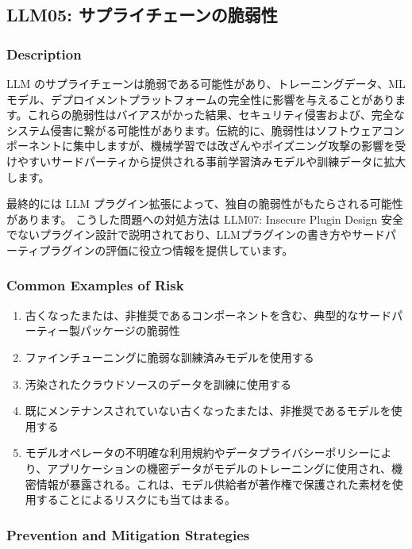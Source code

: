 \documentclass[
]{article}
\author{}
\date{}
\providecommand{\tightlist}{%
  \setlength{\itemsep}{0pt}\setlength{\parskip}{0pt}}
\begin{document}
\subsection{LLM05:
サプライチェーンの脆弱性}\label{llm05-ux30b5ux30d7ux30e9ux30a4ux30c1ux30a7ux30fcux30f3ux306eux8106ux5f31ux6027}

\subsubsection{Description}\label{description}

LLM
のサプライチェーンは脆弱である可能性があり、トレーニングデータ、MLモデル、デプロイメントプラットフォームの完全性に影響を与えることがあります。これらの脆弱性はバイアスがかった結果、セキュリティ侵害および、完全なシステム侵害に繋がる可能性があります。伝統的に、脆弱性はソフトウェアコンポーネントに集中しますが、機械学習では改ざんやポイズニング攻撃の影響を受けやすいサードパーティから提供される事前学習済みモデルや訓練データに拡大します。

最終的には LLM
プラグイン拡張によって、独自の脆弱性がもたらされる可能性があります。
こうした問題への対処方法は LLM07: Insecure Plugin Design
安全でないプラグイン設計で説明されており、LLMプラグインの書き方やサードパーティプラグインの評価に役立つ情報を提供しています。

\subsubsection{Common Examples of Risk}\label{common-examples-of-risk}

\begin{enumerate}
\def\labelenumi{\arabic{enumi}.}
\tightlist
\item
  古くなったまたは、非推奨であるコンポーネントを含む、典型的なサードパーティー製パッケージの脆弱性
\item
  ファインチューニングに脆弱な訓練済みモデルを使用する
\item
  汚染されたクラウドソースのデータを訓練に使用する
\item
  既にメンテナンスされていない古くなったまたは、非推奨であるモデルを使用する
\item
  モデルオペレータの不明確な利用規約やデータプライバシーポリシーにより、アプリケーションの機密データがモデルのトレーニングに使用され、機密情報が暴露される。これは、モデル供給者が著作権で保護された素材を使用することによるリスクにも当てはまる。
\end{enumerate}

\subsubsection{Prevention and Mitigation
Strategies}\label{prevention-and-mitigation-strategies}
\end{document}
